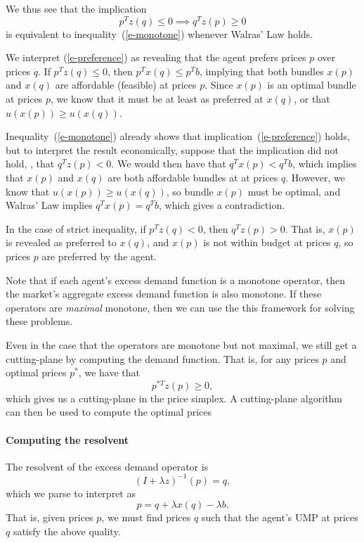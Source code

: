 \documentclass[12pt]{article}
\begin{document}
We thus see that the implication
\begin{equation}
\label{e-preference}
p^T z(q) \leq 0 \implies q^T z(p) \geq 0
\end{equation}
is equivalent
to inequality~(\ref{e-monotone}) whenever Walras' Law holds.

We interpret (\ref{e-preference}) as revealing that the agent prefers prices
$p$ over prices $q$. If $p^T z(q) \leq 0$, then $p^T x(q) \leq p^T b$, implying
that both bundles $x(p)$ and $x(q)$ are affordable (feasible) at prices $p$.
Since $x(p)$ is an optimal bundle at prices $p$, we know that it must be at least
as preferred at $x(q)$, or that $u(x(p)) \geq u(x(q))$.

Inequality~(\ref{e-monotone}) already shows that implication~(\ref{e-preference})
holds, but to interpret the result economically, suppose that the
implication did not hold, \ie, that $q^T z(p) < 0$. We would then have that
$q^T x(p) < q^T b$, which implies that $x(p)$ and $x(q)$ are both affordable
bundles at at prices $q$. However, we know that $u(x(p)) \geq u(x(q))$, so
bundle $x(p)$ must be optimal, and Walras' Law implies $q^T x(p) = q^T b$, which
gives a contradiction. 

In the case of strict inequality, if $p^T z(q) < 0$, then $q^T z(p) > 0$.
That is, $x(p)$ is revealed as preferred to $x(q)$, and $x(p)$ is not within
budget at prices $q$, so prices $p$ are preferred by the agent.

Note that if each agent's excess demand function is a monotone operator, then
the market's aggregate excess demand function is also monotone. If these
operators are \emph{maximal} monotone, then we can use the this framework for
solving these problems.

Even in the case that the operators are monotone but not maximal, we still get
a cutting-plane by computing the demand function. That is, for any prices $p$
and optimal prices $p^*$, we have that
\[
p^{*T} z(p) \geq 0,
\]
which gives us a cutting-plane in the price simplex.
A cutting-plane algorithm can then be used to compute the optimal prices

\paragraph{Computing the resolvent}
The resolvent of the excess demand operator is
\[
(I + \lambda z)^{-1}(p) = q,
\]
which we parse to interpret as
\[
p = q + \lambda x(q) - \lambda b.
\]
That is, given prices $p$, we must find prices $q$ such that the agent's UMP
at prices $q$ satisfy the above quality.
\end{document}
